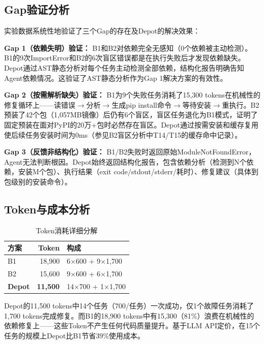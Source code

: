 \documentclass[10pt]{ctexart}
\begin{document}
\subsection{Gap验证分析}
实验数据系统性地验证了三个Gap的存在及Depot的解决效果：

\textbf{Gap 1（依赖失明）验证：} B1和B2对依赖完全无感知（0个依赖被主动检测）。B1的9次ImportError和B2的6次盲区错误都是在执行失败后才发现依赖缺失。Depot通过AST静态分析\cite{pythonast2024}对每个任务主动检测全部依赖，结构化报告明确告知Agent依赖情况。这验证了AST静态分析作为Gap 1解决方案的有效性。

\textbf{Gap 2（按需解析缺失）验证：} B1为9个失败任务消耗了15,300 tokens在机械性的修复循环上——读错误$\rightarrow$分析$\rightarrow$生成pip install命令$\rightarrow$等待安装$\rightarrow$重执行。B2预装了42个包（1,057MB镜像）后仍有6个盲区，盲区任务退化为B1模式，证明了固定预装在面对PyPI的20万+包时必然存在盲区\cite{pypi2024,cox2019dependency}。Depot通过按需安装和缓存复用\cite{uv2024,pip2024}使后续任务安装时间为0ms（参见B2盲区分析中T14/T15的缓存命中记录）。

\textbf{Gap 3（反馈非结构化）验证：} B1/B2失败时返回原始ModuleNotFoundError，Agent无法判断根因。Depot始终返回结构化报告，包含依赖分析（检测到N个依赖，安装M个包）、执行结果（exit code/stdout/stderr/耗时）、修复建议（具体到包级别的安装命令）。

\subsection{Token与成本分析}
\begin{table}[H]
\centering
\caption{Token消耗详细分解}
\label{tab:tokens}
\small
\begin{tabular}{@{}l r l@{}}
\toprule
方案 & Token & 构成 \\
\midrule
B1 & 18,900 & 6$\times$600 + 9$\times$1,700 \\
B2 & 15,600 & 9$\times$600 + 6$\times$1,700 \\
\textbf{Depot} & \textbf{11,500} & 14$\times$700 + 1$\times$1,700 \\
\bottomrule
\end{tabular}
\end{table}

Depot的11,500 tokens中14个任务（700/任务）一次成功，仅1个故障任务消耗了1,700 tokens完成修复。而B1的18,900 tokens中有15,300（81\%）浪费在机械性的依赖修复上——这些Token不产生任何代码质量提升。基于LLM API定价\cite{openai2024pricing,anthropic2024pricing}，在15个任务的规模上Depot比B1节省39\%使用成本。
\end{document}
